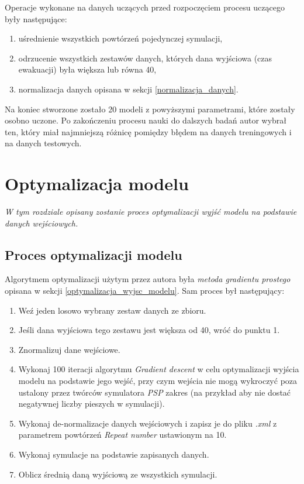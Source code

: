 \documentclass[12pt]{aghdpl}
\begin{document}
		Operacje wykonane na danych uczących przed rozpoczęciem procesu uczącego były następujące:
		\begin{enumerate}
		\item uśrednienie wszystkich powtórzeń pojedynczej symulacji,
		\item odrzucenie wszystkich zestawów danych, których dana wyjściowa (czas ewakuacji) była większa lub równa 40,
		\item normalizacja danych opisana w sekcji \ref{normalizacja_danych}.		
		\end{enumerate}
		
		Na koniec stworzone zostało 20 modeli z powyższymi parametrami, które zostały osobno uczone. Po zakończeniu procesu nauki do dalszych badań autor wybrał ten, który miał najmniejszą różnicę pomiędzy błędem na danych treningowych i na danych testowych.
		
	\chapter{Optymalizacja modelu}
	\textit{W tym rozdziale opisany zostanie proces optymalizacji wyjść modelu na podstawie danych wejściowych.}

		\section{Proces optymalizacji modelu}
		Algorytmem optymalizacji użytym przez autora była \textit{metoda gradientu prostego} opisana w sekcji \ref{optymalizacja_wyjsc_modelu}. Sam proces był następujący:
		\begin{enumerate}
		\item Weź jeden losowo wybrany zestaw danych ze zbioru.
		\item Jeśli dana wyjściowa tego zestawu jest większa od 40, wróć do punktu 1.
		\item Znormalizuj dane wejściowe.
		\item Wykonaj 100 iteracji algorytmu \textit{Gradient descent} w celu optymalizacji wyjścia modelu na podstawie jego wejść, przy czym wejścia nie mogą wykroczyć poza ustalony przez twórców symulatora \textit{PSP} zakres (na przykład aby nie dostać negatywnej liczby pieszych w symulacji).
		\item Wykonaj de-normalizacje danych wejściowych i zapisz je do pliku \textit{.xml} z parametrem powtórzeń \textit{Repeat number} ustawionym na 10.
		\item Wykonaj symulacje na podstawie zapisanych danych.
		\item Oblicz średnią daną wyjściową ze wszystkich symulacji.
		\end{enumerate}
		
\end{document}
